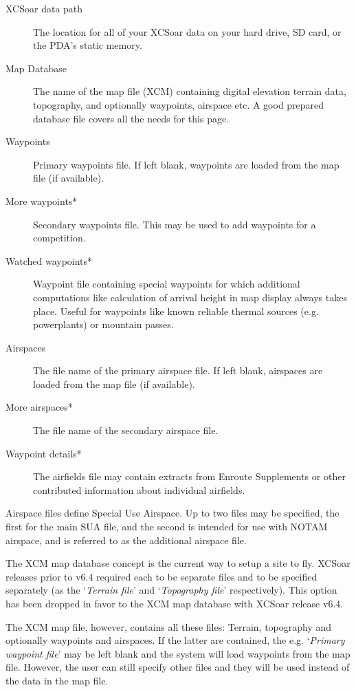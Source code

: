 \begin{description}
\item[XCSoar data path]  The location for all of your XCSoar data on your hard drive, 
  SD card, or the PDA's static memory.
\item[Map Database]  The name of the map file (XCM) containing digital elevation
  terrain data, topography, and optionally waypoints, airspace etc. A good
  prepared database file covers all the needs for this page.
\item[Waypoints]  Primary waypoints file.  If left blank, waypoints are loaded
  from the map file (if available).
\item[More waypoints*]  Secondary waypoints file.  This may be used to add 
  waypoints for a competition.
\item[Watched waypoints*]  Waypoint file containing special waypoints for 
  which additional computations   like calculation of arrival height in map 
  display always takes place. Useful for waypoints   like known reliable 
  thermal sources (e.g. powerplants) or mountain passes.
\item[Airspaces]  The file name of the primary airspace file.  If left blank,
  airspaces are loaded from the map file (if available).
\item[More airspaces*]  The file name of the secondary airspace file.
\item[Waypoint details*]  The airfields file may contain extracts from 
  Enroute Supplements or other contributed information about individual airfields.
\end{description}

Airspace files define Special Use Airspace.  Up to two files may be
specified, the first for the main SUA file, and the second is intended
for use with NOTAM airspace, and is referred to as the additional
airspace file.

The XCM map database concept is the current way to setup a site to fly.
XCSoar releases prior to v6.4 required each to be separate files and to be
specified separately (as the `{\it Terrain file}' and `{\it Topography file}' respectively). This 
option has been dropped in favor to the XCM map database with XCSoar release v6.4.  

The XCM map file, however, contains all these files: Terrain, topography
and optionally waypoints and airspaces.  If the latter are contained, the e.g. `{\it Primary waypoint file}' 
may be left blank and the system will load waypoints from the map file. 
However, the user can still specify other files and they will be used instead of 
the data in the map file.

